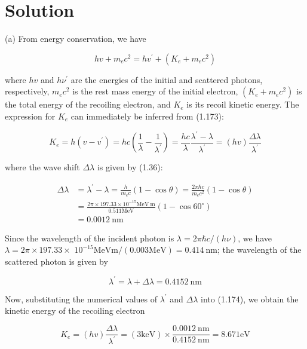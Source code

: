 \documentclass[10pt]{article}
\begin{document}
\section*{Solution}
(a) From energy conservation, we have


\begin{equation*}
h v+m_{e} c^{2}=h v^{\prime}+\left(K_{e}+m_{e} c^{2}\right) \tag{1.173}
\end{equation*}


where $h v$ and $h \nu^{\prime}$ are the energies of the initial and scattered photons, respectively, $m_{e} c^{2}$ is the rest mass energy of the initial electron, $\left(K_{e}+m_{e} c^{2}\right)$ is the total energy of the recoiling electron, and $K_{e}$ is its recoil kinetic energy. The expression for $K_{e}$ can immediately be inferred from (1.173):


\begin{equation*}
K_{e}=h\left(v-v^{\prime}\right)=h c\left(\frac{1}{\lambda}-\frac{1}{\lambda^{\prime}}\right)=\frac{h c}{\lambda} \frac{\lambda^{\prime}-\lambda}{\lambda^{\prime}}=(h v) \frac{\Delta \lambda}{\lambda^{\prime}} \tag{1.174}
\end{equation*}


where the wave shift $\Delta \lambda$ is given by (1.36):


\begin{align*}
\Delta \lambda & =\lambda^{\prime}-\lambda=\frac{h}{m_{e} c}(1-\cos \theta)=\frac{2 \pi \hbar c}{m_{e} c^{2}}(1-\cos \theta) \\
& =\frac{2 \pi \times 197.33 \times 10^{-15} \mathrm{MeV} \mathrm{~m}}{0.511 \mathrm{MeV}}\left(1-\cos 60^{\circ}\right) \\
& =0.0012 \mathrm{~nm} \tag{1.175}
\end{align*}


Since the wavelength of the incident photon is $\lambda=2 \pi \hbar c /(h \nu)$, we have $\lambda=2 \pi \times 197.33 \times$ $10^{-15} \mathrm{MeV} \mathrm{m} /(0.003 \mathrm{MeV})=0.414 \mathrm{~nm}$; the wavelength of the scattered photon is given by


\begin{equation*}
\lambda^{\prime}=\lambda+\Delta \lambda=0.4152 \mathrm{~nm} \tag{1.176}
\end{equation*}


Now, substituting the numerical values of $\lambda^{\prime}$ and $\Delta \lambda$ into (1.174), we obtain the kinetic energy of the recoiling electron


\begin{equation*}
K_{e}=(h v) \frac{\Delta \lambda}{\lambda^{\prime}}=(3 \mathrm{keV}) \times \frac{0.0012 \mathrm{~nm}}{0.4152 \mathrm{~nm}}=8.671 \mathrm{eV} \tag{1.177}
\end{equation*}
\end{document}
